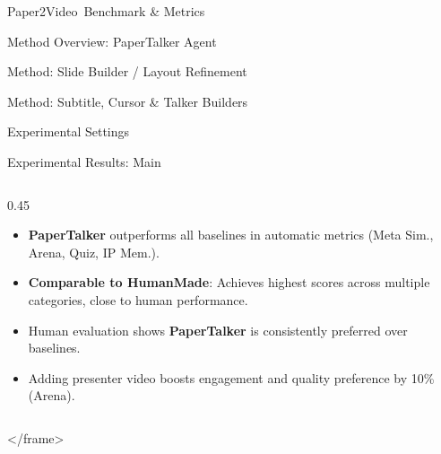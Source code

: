 \documentclass{beamer}
\newcommand{\alertterm}[1]{\alert{\textbf{#1}}}
\newcommand{\bench}{Paper2Video}
\begin{document}
\begin{frame}{\bench~Benchmark \& Metrics}
\begin{frame}{Method Overview: PaperTalker Agent}
\begin{frame}{Method: Slide Builder / Layout Refinement}
\begin{frame}{Method: Subtitle, Cursor \& Talker Builders}
\begin{frame}{Experimental Settings}
\begin{frame}{Experimental Results: Main}
\begin{columns}
\begin{column}{0.45\linewidth}
      \small
      \begin{itemize}
        \item \alertterm{PaperTalker} outperforms all baselines in automatic metrics (Meta Sim., Arena, Quiz, IP Mem.).
        \item \alertterm{Comparable to HumanMade}: Achieves highest scores across multiple categories, close to human performance.
        \item Human evaluation shows \alertterm{PaperTalker} is consistently preferred over baselines.
        \item Adding presenter video boosts engagement and quality preference by 10\% (Arena).
      \end{itemize}
    \end{column}
  \end{columns}
</frame>


\end{frame}
\end{frame}
\end{frame}
\end{frame}
\end{frame}
\end{frame}
\end{document}
